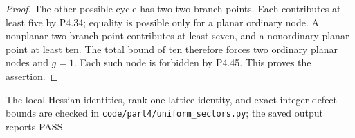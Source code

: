 \begin{proof}
The other possible cycle has two two-branch points.
Each contributes at least five by P4.34; equality is
possible only for a planar ordinary node. A nonplanar
two-branch point contributes at least seven, and a
nonordinary planar point at least ten. The total bound
of ten therefore forces two ordinary planar nodes
and $g=1$. Each such node is forbidden by P4.45.
This proves the assertion.
\end{proof}

The local Hessian identities, rank-one lattice identity,
and exact integer defect bounds are checked in
\texttt{code/part4/uniform\_sectors.py}; the saved output
reports PASS.
